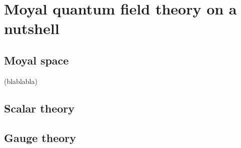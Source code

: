 \documentclass[10pt]{book}
\theoremstyle{break}
\begin{document}
\chapter{Moyal quantum field theory on a nutshell}



\section{Moyal space}


(blablabla)



\section{Scalar theory}


\section{Gauge theory}








\end{document}
